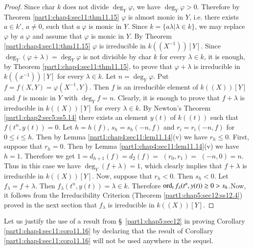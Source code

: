 \begin{proof}
  Since char $k$ does not divide $\deg_Y \varphi$, we have $\deg_Y
  \varphi > 0$. Therefore by Theorem \ref{part1:chap4:sec11:thm11.15}
  $\varphi$ is almost monic in $Y$, i.e. there exists $a \in k'$, $a
  \neq 0$, such that $a \; \varphi$ is monic in $Y$. Since $k = \{
  a\lambda \Big| \lambda \in k \}$, we may replace $\varphi$ by $a
  \; \varphi$ and assume that $\varphi$ is monic in $Y$. By
  Theorem \ref{part1:chap4:sec11:thm11.15} $\varphi$ is irreducible in
  $k((X^{-1})) [Y]$. Since $\deg_{Y} (\varphi+ \lambda)= \deg_Y
  \varphi$ is not divisible by char $k$ for every $\lambda \in k$, it
  is enough, by Theorem \ref{part1:chap4:sec11:thm11.15}, to prove
  that $\varphi+\lambda$ is irreducible in $k((x^{-1}))[Y]$ for every
  $\lambda \in k$. Let $n = \deg_Y \varphi$. Put $f = f(X, Y)=
  \varphi(X^{-1}, Y)$. Then $f$ is an irreducible element of $k((X))
         [Y]$ and $f$ is monic in $Y$ with $\deg_Y f=n$. Clearly, it
         is enough to prove that $f + \lambda$ is irreducible in
         $k((X))[Y]$ for every $\lambda \in k$. By Newton's Theorem
         \ref{part1:chap2:sec5:ss5.14} there exists an element $y(t)$
         of $k((t))$ such that $f(t^n, y(t))=0$. Let $h= h(f)$, $s_h=
         s_h (-n, f)$ and $r_i = r_i (-n, f)$ for $0 \leq i \leq
         h$. Then by Lemma \ref{part1:chap4:sec11:lem11.14}(v) we have
         $r_h \leq 0$. First, suppose that $r_h=0$. Then by Lemma
         \ref{part1:chap4:sec11:lem11.14}(v) we have $h=1$. Therefore
         we get $1= d_{h+1}(f)=d_2 (f)=$ \gcd $(r_0, r_1)=$ \gcd $(-n,
         0)=n$. Thus in this case we have $\deg_Y (f+ \lambda)=1$,
         which clearly implies that $f + \lambda$ is irreducible in
         $k((X))[Y]$. Now, suppose that $r_h< 0$. Then $s_h < 0$.  Let $f_\lambda = f+ \lambda$. Then $f_\lambda (t^n,y(t))= \lambda \in k$. Therefore $\operatorname{ord}_t f_\lambda (t^n,
         y(t))\geq 0 > s_h$.\pageoriginale Now, it follows from the
         Irreducibility Criterion (Theorem \ref{part1:chap5:sec12:ss12.4}) proved in the next 
         section that $f_\lambda$ is irreducible in $k((X))[Y]$.
\end{proof}

\begin{remark}\label{part1:chap4:sec11:rem11.17}
  Let us justify the use of a result from \S\ \ref{part1:chap5:sec12}
  in proving Corollary \ref{part1:chap4:sec11:coro11.16} by declaring
  that the result of Corollary \ref{part1:chap4:sec11:coro11.16} will
  not be used anywhere in the sequel.
\end{remark}

